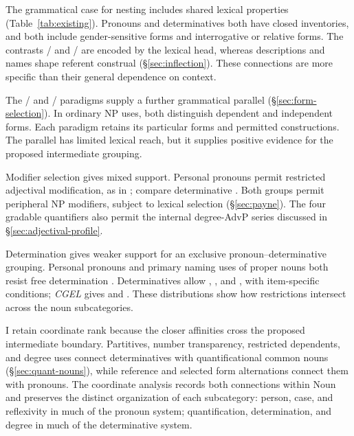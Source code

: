 \documentclass[12pt]{article}
\begin{document}
The grammatical case for nesting includes shared lexical properties (Table~\ref{tab:existing}). Pronouns and determinatives both have closed inventories, and both include gender-sensitive forms and interrogative or relative forms. The contrasts / and / are encoded by the lexical head, whereas descriptions and names shape referent construal (§\ref{sec:inflection}). These connections are more specific than their general dependence on context.

The / and / paradigms supply a further grammatical parallel (§\ref{sec:form-selection}). In ordinary NP uses, both distinguish dependent and independent forms. Each paradigm retains its particular forms and permitted constructions. The parallel has limited lexical reach, but it supplies positive evidence for the proposed intermediate grouping.

Modifier selection gives mixed support. Personal pronouns permit restricted adjectival modification, as in  \citep[429--430]{huddleston2002}; compare determinative . Both groups permit peripheral NP modifiers, subject to lexical selection (§\ref{sec:payne}). The four gradable quantifiers also permit the internal degree-AdvP series discussed in §\ref{sec:adjectival-profile}.

Determination gives weaker support for an exclusive pronoun--determinative grouping. Personal pronouns and primary naming uses of proper nouns both resist free determination \citep[429--430, 517, 519--520]{huddleston2002}. Determinatives allow , , and , with item-specific conditions; \textit{CGEL} gives  and  \citep[415--416]{huddleston2002}. These distributions show how restrictions intersect across the noun subcategories.

I retain coordinate rank because the closer affinities cross the proposed intermediate boundary. Partitives, number transparency, restricted dependents, and degree uses connect determinatives with quantificational common nouns (§\ref{sec:quant-nouns}), while reference and selected form alternations connect them with pronouns. The coordinate analysis records both connections within Noun and preserves the distinct organization of each subcategory: person, case, and reflexivity in much of the pronoun system; quantification, determination, and degree in much of the determinative system.
\end{document}
